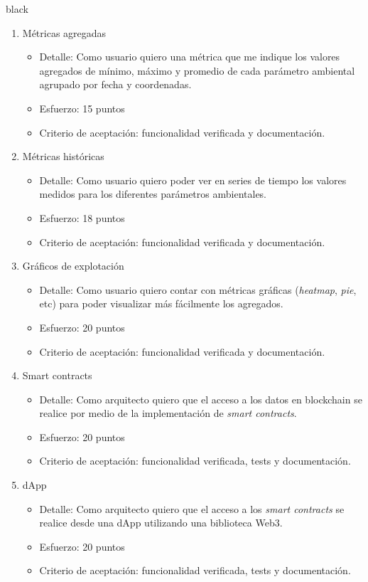 \documentclass[
11pt, %
]{charter}
\begin{document}
\begin{consigna}{black}
\begin{enumerate}
	\item Métricas agregadas
	\begin{itemize}
		\item Detalle: Como usuario quiero una métrica que me indique los valores agregados de mínimo, máximo y promedio de cada parámetro ambiental agrupado por fecha y coordenadas.
		\item Esfuerzo: 15 puntos
		\item Criterio de aceptación: funcionalidad verificada y documentación.
	\end{itemize}
	
	\item Métricas históricas
	\begin{itemize}
		\item Detalle: Como usuario quiero poder ver en series de tiempo los valores medidos para los diferentes parámetros ambientales.
		\item Esfuerzo: 18 puntos
		\item Criterio de aceptación: funcionalidad verificada y documentación.
	\end{itemize}
	
	\item Gráficos de explotación
	\begin{itemize}
		\item Detalle: Como usuario quiero contar con métricas gráficas (\textit{heatmap}, \textit{pie}, etc) para poder visualizar más fácilmente los agregados.
		\item Esfuerzo: 20 puntos
		\item Criterio de aceptación: funcionalidad verificada y documentación.
	\end{itemize}
	
	\item Smart contracts
	\begin{itemize}
		\item Detalle: Como arquitecto quiero que el acceso a los datos en blockchain se realice por medio de la implementación de \textit{smart contracts}.
		\item Esfuerzo: 20 puntos
		\item Criterio de aceptación: funcionalidad verificada, tests y documentación.
	\end{itemize}
	
	\item dApp
	\begin{itemize}
		\item Detalle: Como arquitecto quiero que el acceso a los \textit{smart contracts} se realice desde una dApp utilizando una biblioteca Web3.
		\item Esfuerzo: 20 puntos
		\item Criterio de aceptación: funcionalidad verificada, tests y documentación.
	\end{itemize}
	

\end{enumerate}
\end{consigna}
\end{document}
